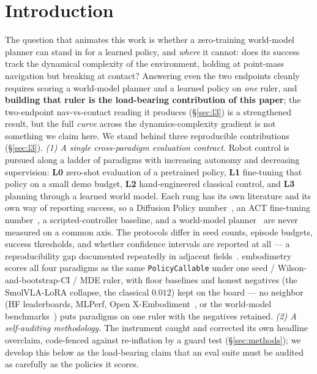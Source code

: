 \documentclass[10pt]{article}
\begin{document}

\section{Introduction}

The question that animates this work is whether a zero-training world-model
planner can stand in for a learned policy, and \emph{where} it cannot:
does its success track the dynamical complexity of the environment, holding
at point-mass navigation but breaking at contact? Answering even the two
endpoints cleanly requires scoring a world-model planner and a learned
policy on \emph{one} ruler, and \textbf{building that ruler is the
load-bearing contribution of this paper}; the two-endpoint nav-vs-contact
reading it produces (\S\ref{sec:l3}) is a strengthened result, but the full
\emph{curve} across the dynamics-complexity gradient is not something we
claim here. We stand behind three reproducible contributions
(\S\ref{sec:l3}). \emph{(1) A single cross-paradigm evaluation contract.}
Robot control is pursued along a ladder of paradigms with increasing
autonomy and decreasing supervision: \textbf{L0} zero-shot evaluation of
a pretrained policy, \textbf{L1} fine-tuning that policy on a small demo
budget, \textbf{L2} hand-engineered classical control, and \textbf{L3}
planning through a learned world model. Each rung has its own literature
and its own way of reporting success, so a Diffusion Policy
number~\cite{chi2023diffusion}, an ACT fine-tuning
number~\cite{zhao2023learning}, a scripted-controller baseline, and a
world-model planner~\cite{zhou2024dinowm,assran2025vjepa2} are never
measured on a common axis. The protocols differ in seed counts, episode
budgets, success thresholds, and whether confidence intervals are
reported at all --- a reproducibility gap documented repeatedly in
adjacent fields~\cite{henderson2018deep,agarwal2021deep}. embodimetry
scores all four paradigms as the same \texttt{PolicyCallable} under one
seed / Wilson-and-bootstrap-CI / MDE ruler, with floor baselines and
honest negatives (the SmolVLA-LoRA collapse, the classical $0.012$) kept
on the board --- no neighbor (HF leaderboards, MLPerf, Open
X-Embodiment~\cite{bohg2025open}, or the world-model
benchmarks~\cite{zhou2024dinowm,assran2025vjepa2}) puts paradigms on one
ruler with the negatives retained. \emph{(2) A self-auditing methodology.}
The instrument caught and corrected its own headline overclaim, code-fenced
against re-inflation by a guard test (\S\ref{sec:methods}); we develop this
below as the load-bearing claim that an eval suite must be audited as
carefully as the policies it scores.
\end{document}
